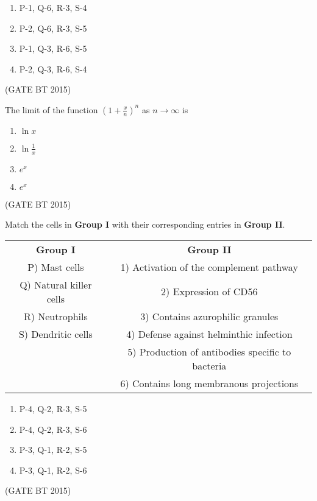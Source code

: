 \begin{multicols}{2}
\begin{enumerate}
    \item P-1, Q-6, R-3, S-4
    \item P-2, Q-6, R-3, S-5
    \item P-1, Q-3, R-6, S-5
    \item P-2, Q-3, R-6, S-4
\end{enumerate}
\end{multicols}\hfill (GATE BT 2015)


\item The limit of the function $\left(1 + \tfrac{x}{n}\right)^{n}$ as $n \to \infty$ is

\begin{multicols}{2}
\begin{enumerate}
    \item $\ln x$
    \item $\ln \tfrac{1}{x}$
    \item $e^{x}$
    \item $e^{x}$ %
\end{enumerate}
\end{multicols}\hfill (GATE BT 2015)


\item Match the cells in \textbf{Group I} with their corresponding entries in \textbf{Group II}.  

\begin{table}[H]
\begin{tabular}{cc}
\textbf{Group I} & \textbf{Group II} \\
P) Mast cells              & 1) Activation of the complement pathway \\
Q) Natural killer cells    & 2) Expression of CD56 \\
R) Neutrophils             & 3) Contains azurophilic granules \\
S) Dendritic cells         & 4) Defense against helminthic infection \\
                          & 5) Production of antibodies specific to bacteria \\
                          & 6) Contains long membranous projections \\
\end{tabular}
\end{table}

\begin{multicols}{2}
\begin{enumerate}
    \item P-4, Q-2, R-3, S-5
    \item P-4, Q-2, R-3, S-6
    \item P-3, Q-1, R-2, S-5
    \item P-3, Q-1, R-2, S-6
\end{enumerate}
\end{multicols}\hfill (GATE BT 2015)

